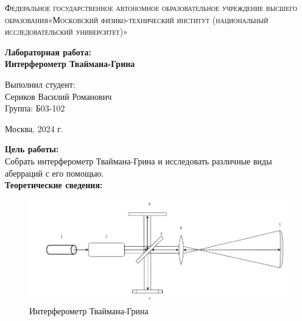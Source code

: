 \documentclass[a4paper, 12pt]{article}%
\begin{document}
	\begin{titlepage}
		\begin{center}
			\textsc{Федеральное государственное автономное образовательное учреждение высшего образования«Московский физико-технический институт (национальный исследовательский университет)»\\[5mm]
			}
			
			\vfill
			
			\textbf{Лабораторная работа: \\[3mm]
				Интерферометр Тваймана-Грина
				\\[50mm]
			}
			
		\end{center}
		
		\hfill
		\begin{minipage}{.5\textwidth}
			Выполнил студент:\\[2mm]
			Сериков Василий Романович\\[2mm]
			Группа: Б03-102\\[5mm]
			
		\end{minipage}
		\vfill
		\begin{center}
			Москва, 2024 г.
		\end{center}
		
	\end{titlepage}
	
	\newpage
	\textbf{Цель работы: }\\
	
	Собрать интерферометр  Тваймана-Грина и исследовать различные виды аберраций с его помощью.\\ 
	
	\textbf{Теоретические сведения: }\\
	
	\begin{figure}[H]
		\centering
		\includegraphics[width=0.9\linewidth]{ust.png}
		\caption{Интерферометр Тваймана-Грина}
	\end{figure}
	
\end{document}
